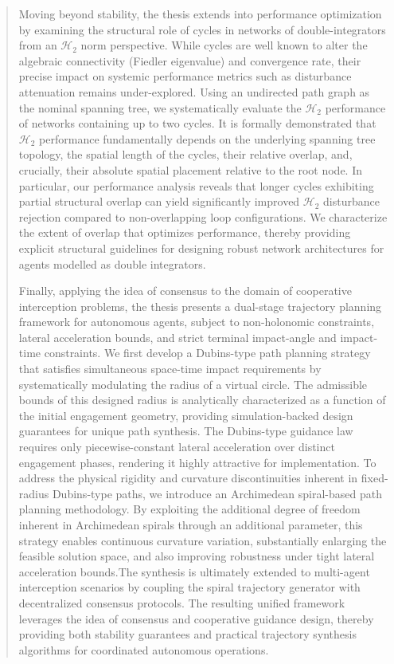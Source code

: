 \begin{abstract}
Moving beyond stability, the thesis extends into performance optimization by examining the structural role of cycles in networks of double-integrators from an $\mathcal{H}_2$ norm perspective. While cycles are well known to alter the algebraic connectivity (Fiedler eigenvalue) and convergence rate, their precise impact on systemic performance metrics such as disturbance attenuation remains under-explored. Using an undirected path graph as the nominal spanning tree, we systematically evaluate the $\mathcal{H}_2$ performance of networks containing up to two cycles. It is formally demonstrated that $\mathcal{H}_2$ performance fundamentally depends on the underlying spanning tree topology, the spatial length of the cycles, their relative overlap, and, crucially, their absolute spatial placement relative to the root node. In particular, our performance analysis reveals that longer cycles exhibiting partial structural overlap can yield significantly improved $\mathcal{H}_2$ disturbance rejection compared to non-overlapping loop configurations. We characterize the extent of overlap that optimizes performance, thereby providing explicit structural guidelines for designing robust network architectures for agents modelled as double integrators.

Finally, applying the idea of consensus to the domain of cooperative interception problems, the thesis presents a dual-stage trajectory planning framework for autonomous agents, subject to non-holonomic constraints, lateral acceleration bounds, and strict terminal impact-angle and impact-time constraints. We first develop a Dubins-type path planning strategy that satisfies simultaneous space-time impact requirements by systematically modulating the radius of a virtual circle. The admissible bounds of this designed radius is analytically characterized as a function of the initial engagement geometry, providing simulation-backed design guarantees for unique path synthesis. The Dubins-type guidance law requires only piecewise-constant lateral acceleration over distinct engagement phases, rendering it highly attractive for implementation. To address the physical rigidity and curvature discontinuities inherent in fixed-radius Dubins-type paths, we introduce an Archimedean spiral-based path planning methodology. By exploiting the additional degree of freedom inherent in Archimedean spirals through an additional parameter, this strategy enables continuous curvature variation, substantially enlarging the feasible solution space, and also improving robustness under tight lateral acceleration bounds.The synthesis is ultimately extended to multi-agent interception scenarios by coupling the spiral trajectory generator with decentralized consensus protocols. The resulting unified framework leverages the idea of consensus and cooperative guidance design, thereby providing both stability guarantees and practical trajectory synthesis algorithms for coordinated autonomous operations.
\end{abstract}

